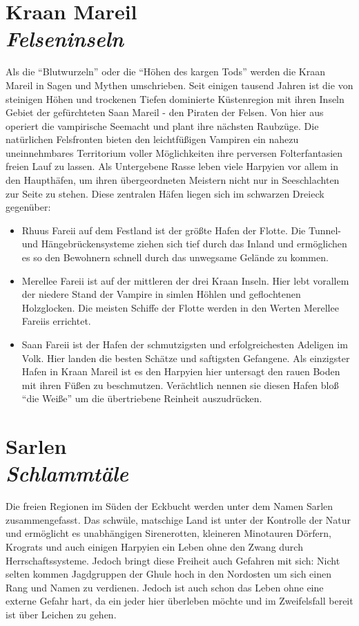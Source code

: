 \section*{Kraan Mareil \\ \textit{Felseninseln}}

Als die “Blutwurzeln” oder die “Höhen des kargen Tods” werden die Kraan Mareil in Sagen und Mythen umschrieben. Seit einigen tausend Jahren ist die von steinigen Höhen und trockenen Tiefen dominierte Küstenregion mit ihren Inseln Gebiet der gefürchteten Saan Mareil - den Piraten der Felsen. Von hier aus operiert die vampirische Seemacht und plant ihre nächsten Raubzüge. Die natürlichen Felsfronten bieten den leichtfüßigen Vampiren ein nahezu uneinnehmbares Territorium voller Möglichkeiten ihre perversen Folterfantasien freien Lauf zu lassen. Als Untergebene Rasse leben viele Harpyien vor allem in den Haupthäfen, um ihren übergeordneten Meistern nicht nur in Seeschlachten zur Seite zu stehen. Diese zentralen Häfen liegen sich im schwarzen Dreieck gegenüber:
\begin{itemize}
    \item Rhuus Fareii auf dem Festland ist der größte Hafen der Flotte. Die Tunnel- und Hängebrückensysteme ziehen sich tief durch das Inland und ermöglichen es so den Bewohnern schnell durch das unwegsame Gelände zu kommen.
    \item Merellee Fareii ist auf der mittleren der drei Kraan Inseln. Hier lebt vorallem der niedere Stand der Vampire in simlen Höhlen und geflochtenen Holzglocken. Die meisten Schiffe der Flotte werden in den Werten Merellee Fareiis errichtet.
    \item Saan Fareii ist der Hafen der schmutzigsten und erfolgreichesten Adeligen im Volk. Hier landen die besten Schätze und saftigsten Gefangene. Als einzigster Hafen in Kraan Mareil ist es den Harpyien hier untersagt den rauen Boden mit ihren Füßen zu beschmutzen. Verächtlich nennen sie diesen Hafen bloß “die Weiße” um die übertriebene Reinheit auszudrücken.
\end{itemize}

\section*{Sarlen \\ \textit{Schlammtäle}}

Die freien Regionen im Süden der Eckbucht werden unter dem Namen Sarlen zusammengefasst. Das schwüle, matschige Land ist unter der Kontrolle der Natur und ermöglicht es unabhängigen Sirenerotten, kleineren Minotauren Dörfern, Krograts und auch einigen Harpyien ein Leben ohne den Zwang durch Herrschaftssysteme. Jedoch bringt diese Freiheit auch Gefahren mit sich: Nicht selten kommen Jagdgruppen der Ghule hoch in den Nordosten um sich einen Rang und Namen zu verdienen. Jedoch ist auch schon das Leben ohne eine externe Gefahr hart, da ein jeder hier überleben möchte und im Zweifelsfall bereit ist über Leichen zu gehen.

